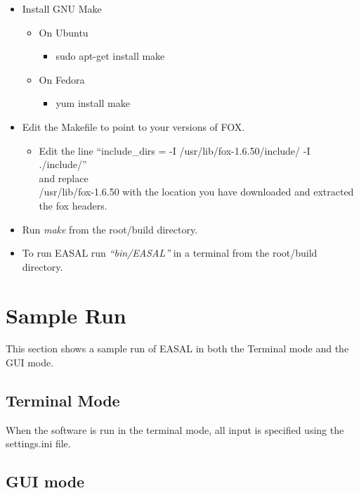 \documentclass[10pt]{article}
\begin{document}
\begin{itemize}
\begin{itemize}
	   \end{itemize}
	 \item Install GNU Make
	   \begin{itemize}
	   	   \item On Ubuntu 
	   	   \begin{itemize}
			\item sudo apt-get install make
		   \end{itemize}	
		   \item On Fedora
		   \begin{itemize}
			\item yum install make
\end{itemize}
		   \end{itemize}
	 \item Edit the Makefile to point to your versions of FOX.
	   \begin{itemize}
	   	   \item Edit the line 
	   	   	 ``include\_dirs = -I /usr/lib/fox-1.6.50/include/ -I ./include/''\\
	   	   	 and replace \\
	   	   	 /usr/lib/fox-1.6.50 with the location you have downloaded and extracted the fox headers.
		\end{itemize}
	 \item Run \emph{make} from the root/build directory.
	 \item To run EASAL run \emph{``bin/EASAL''} in a terminal from the root/build directory.
\end{itemize}%




\section{Sample Run}
\label{sec:run}
This section shows a sample run of EASAL in both the Terminal mode and the GUI mode.

\subsection{Terminal Mode}
\label{sub:TMode}
When the software is run in the terminal mode, all input is specified using the settings.ini file. 

\subsection{GUI mode}
\label{sub:GUIMode}
\end{document}
